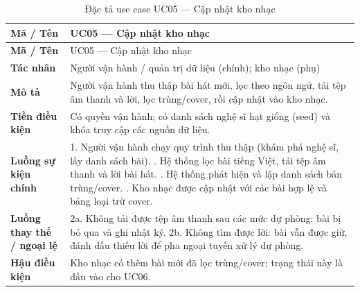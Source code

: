 \documentclass[../DoAn.tex]{subfiles}
\begin{document}
\begin{longtable}{|p{3.0cm}|p{11.0cm}|}
\caption{Đặc tả use case UC05 --- Cập nhật kho nhạc}\label{table:uc05}\\
\hline
\textbf{Mã / Tên} & UC05 --- Cập nhật kho nhạc \\
\hline
\endfirsthead
\hline
\textbf{Mã / Tên} & UC05 --- Cập nhật kho nhạc \\
\hline
\endhead
\textbf{Tác nhân} & Người vận hành / quản trị dữ liệu (chính); kho nhạc (phụ) \\ \hline
\textbf{Mô tả} & Người vận hành thu thập bài hát mới, lọc theo ngôn ngữ, tải tệp âm thanh và lời, lọc trùng/cover, rồi cập nhật vào kho nhạc. \\ \hline
\textbf{Tiền điều kiện} & Có quyền vận hành; có danh sách nghệ sĩ hạt giống (seed) và khóa truy cập các nguồn dữ liệu. \\ \hline
\textbf{Luồng sự kiện chính} & 1. Người vận hành chạy quy trình thu thập (khám phá nghệ sĩ, lấy danh sách bài). \newline 2. Hệ thống lọc bài tiếng Việt, tải tệp âm thanh và lời bài hát. \newline 3. Hệ thống phát hiện và lập danh sách bản trùng/cover. \newline 4. Kho nhạc được cập nhật với các bài hợp lệ và bảng loại trừ cover. \\ \hline
\textbf{Luồng thay thế / ngoại lệ} & 2a. Không tải được tệp âm thanh sau các mức dự phòng: bài bị bỏ qua và ghi nhật ký. \newline 2b. Không tìm được lời: bài vẫn được giữ, đánh dấu thiếu lời để pha ngoại tuyến xử lý dự phòng. \\ \hline
\textbf{Hậu điều kiện} & Kho nhạc có thêm bài mới đã lọc trùng/cover; trạng thái này là đầu vào cho UC06. \\ \hline
\end{longtable}
\end{document}
